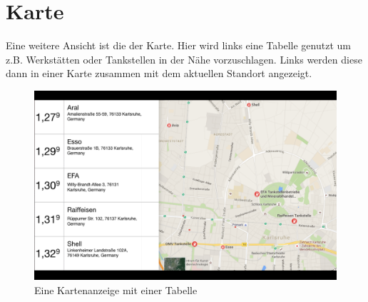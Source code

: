 \documentclass[pflichtenheft.tex]{subfiles}
\begin{document}
\clearpage
\section{Karte}
\label{sec:Karte}

Eine weitere Ansicht ist die der Karte. Hier wird links eine Tabelle genutzt um z.B. Werkstätten oder Tankstellen in der Nähe vorzuschlagen. Links werden diese dann in einer Karte zusammen mit dem aktuellen Standort angezeigt.

\begin{figure}[H]
  	\begin{center}
 		\includegraphics[width=\textwidth]{Images/GUI-Map.png}
  		\caption{Eine Kartenanzeige mit einer Tabelle}
  	\end{center}
\end{figure}
\end{document}
